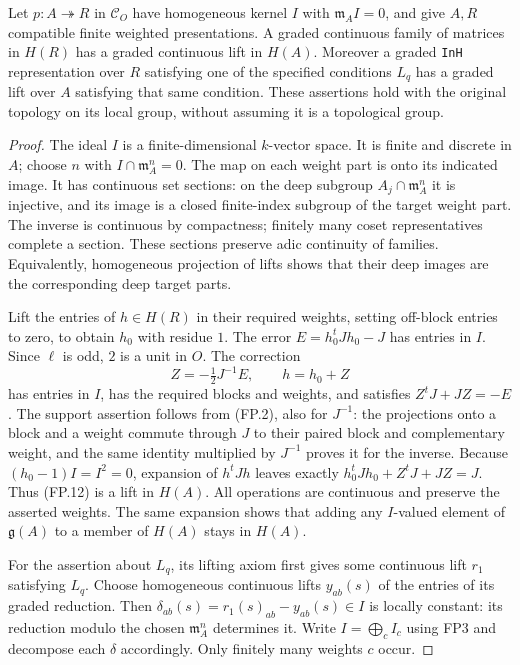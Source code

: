 \begin{proposition}
\label{claim:FP4}
Let $p:A\twoheadrightarrow R$ in $\mathcal C_O$ have homogeneous
kernel $I$ with $\mathfrak m_AI=0$, and give $A,R$ compatible
finite weighted presentations.  A graded continuous family of
matrices in $H(R)$ has a graded continuous lift in $H(A)$.
Moreover a graded \texttt{InH} representation over $R$ satisfying
one of the specified conditions $L_q$ has a graded lift over $A$
satisfying that same condition.
These assertions hold with the original topology on its local
group, without assuming it is a topological group.
\end{proposition}

\begin{proof}
The ideal $I$ is a finite-dimensional $k$-vector space.  It is
finite and discrete in $A$; choose $n$ with
$I\cap\mathfrak m_A^n=0$.
The map on each weight part is onto its indicated image.
It has continuous set sections: on the deep subgroup
$A_j\cap\mathfrak m_A^n$ it is injective, and its image is a closed
finite-index subgroup of the target weight part.
The inverse is continuous by compactness; finitely many coset
representatives complete a section.
These sections preserve adic continuity of families.
Equivalently, homogeneous projection of lifts shows that their
deep images are the corresponding deep target parts.

Lift the entries of $h\in H(R)$ in their required weights, setting
off-block entries to zero, to obtain $h_0$ with residue $1$.
The error $E=h_0^tJh_0-J$ has entries in $I$.
Since $\ell$ is odd, $2$ is a unit in $O$.
The correction
\[
                Z=-\tfrac12J^{-1}E,\qquad h=h_0+Z
 \tag{FP.12}
\]
has entries in $I$, has the required blocks and weights, and
satisfies $Z^tJ+JZ=-E$.
The support assertion follows from (FP.2), also for $J^{-1}$:
the projections onto a block and a weight commute through $J$
to their paired block and complementary weight, and the same
identity multiplied by $J^{-1}$ proves it for the inverse.
Because $(h_0-1)I=I^2=0$, expansion of $h^tJh$ leaves exactly
$h_0^tJh_0+Z^tJ+JZ=J$.  Thus (FP.12) is a lift in $H(A)$.
All operations are continuous and preserve the asserted weights.
The same expansion shows that adding any $I$-valued element of
$\mathfrak g(A)$ to a member of $H(A)$ stays in $H(A)$.

For the assertion about $L_q$, its lifting axiom first gives some
continuous lift $r_1$ satisfying $L_q$.
Choose homogeneous continuous lifts $y_{ab}(s)$ of the entries
of its graded reduction.  Then
$\delta_{ab}(s)=r_1(s)_{ab}-y_{ab}(s)\in I$ is locally constant:
its reduction modulo the chosen $\mathfrak m_A^n$ determines it.
Write $I=\bigoplus_c I_c$ using FP3 and decompose each $\delta$
accordingly.  Only finitely many weights $c$ occur.


\end{proof}

